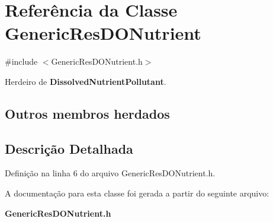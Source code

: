 \section{Referência da Classe Generic\+Res\+D\+O\+Nutrient}
\label{class_generic_res_d_o_nutrient}


{\ttfamily \#include $<$Generic\+Res\+D\+O\+Nutrient.\+h$>$}



Herdeiro de {\bf Dissolved\+Nutrient\+Pollutant}.

\subsection*{Outros membros herdados}


\subsection{Descrição Detalhada}


Definição na linha 6 do arquivo Generic\+Res\+D\+O\+Nutrient.\+h.



A documentação para esta classe foi gerada a partir do seguinte arquivo\+:\begin{DoxyCompactItemize}
\item 
{\bf Generic\+Res\+D\+O\+Nutrient.\+h}\end{DoxyCompactItemize}
